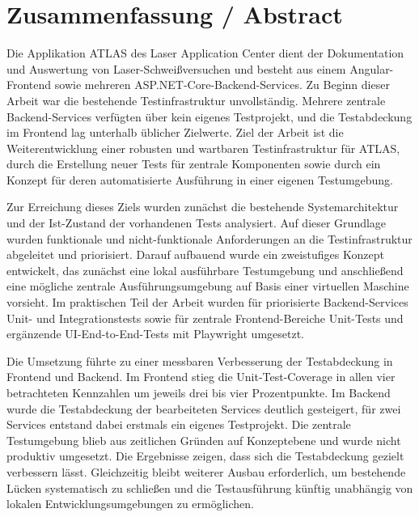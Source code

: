 
\chapter*{Zusammenfassung / Abstract}

Die Applikation \ac{ATLAS} des Laser Application Center dient der Dokumentation und Auswertung von Laser-Schweißversuchen und besteht aus einem Angular-Frontend sowie mehreren ASP.NET-Core-Backend-Services. Zu Beginn dieser Arbeit war die bestehende Testinfrastruktur unvollständig. Mehrere zentrale Backend-Services verfügten über kein eigenes Testprojekt, und die Testabdeckung im Frontend lag unterhalb üblicher Zielwerte. Ziel der Arbeit ist die Weiterentwicklung einer robusten und wartbaren Testinfrastruktur für \ac{ATLAS}, durch die Erstellung neuer Tests für zentrale Komponenten sowie durch ein Konzept für deren automatisierte Ausführung in einer eigenen Testumgebung.

Zur Erreichung dieses Ziels wurden zunächst die bestehende Systemarchitektur und der Ist-Zustand der vorhandenen Tests analysiert. Auf dieser Grundlage wurden funktionale und nicht-funktionale Anforderungen an die Testinfrastruktur abgeleitet und priorisiert. Darauf aufbauend wurde ein zweistufiges Konzept entwickelt, das zunächst eine lokal ausführbare Testumgebung und anschließend eine mögliche zentrale Ausführungsumgebung auf Basis einer virtuellen Maschine vorsieht. Im praktischen Teil der Arbeit wurden für priorisierte Backend-Services Unit- und Integrationstests sowie für zentrale Frontend-Bereiche Unit-Tests und ergänzende UI-End-to-End-Tests mit Playwright umgesetzt.

Die Umsetzung führte zu einer messbaren Verbesserung der Testabdeckung in Frontend und Backend. Im Frontend stieg die Unit-Test-Coverage in allen vier betrachteten Kennzahlen um jeweils drei bis vier Prozentpunkte. Im Backend wurde die Testabdeckung der bearbeiteten Services deutlich gesteigert, für zwei Services entstand dabei erstmals ein eigenes Testprojekt. Die zentrale Testumgebung blieb aus zeitlichen Gründen auf Konzeptebene und wurde nicht produktiv umgesetzt. Die Ergebnisse zeigen, dass sich die Testabdeckung gezielt verbessern lässt. Gleichzeitig bleibt weiterer Ausbau erforderlich, um bestehende Lücken systematisch zu schließen und die Testausführung künftig unabhängig von lokalen Entwicklungsumgebungen zu ermöglichen.

\vspace{1em}

